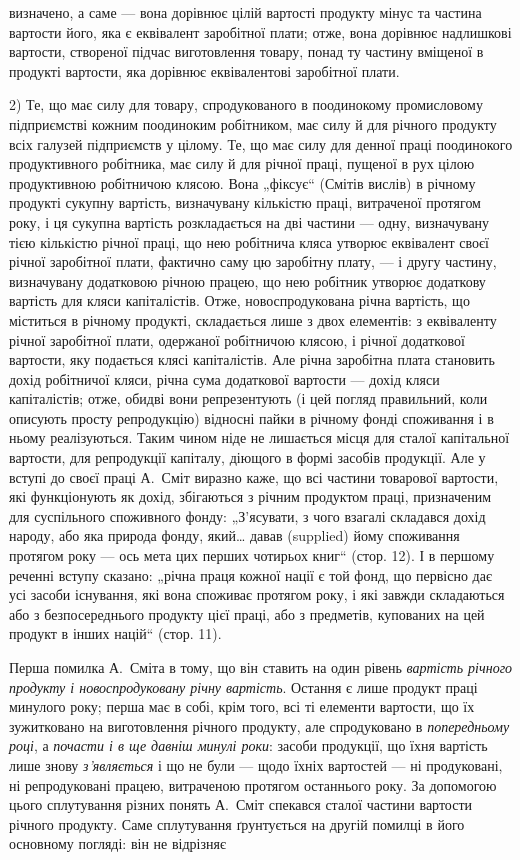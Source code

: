 \parcont{}  %
визначено, а саме — вона дорівнює цілій вартості продукту мінус та частина вартости його, яка є
еквівалент заробітної плати; отже, вона дорівнює надлишкові вартости, створеної підчас виготовлення
товару, понад ту частину вміщеної в продукті вартости, яка дорівнює еквівалентові заробітної плати.

2) Те, що має силу для товару, спродукованого в поодинокому промисловому підприємстві кожним
поодиноким робітником, має силу й для річного продукту всіх галузей підприємств у цілому. Те, що має
силу для денної праці поодинокого продуктивного робітника, має силу й для річної праці, пущеної в
рух цілою продуктивною робітничою клясою. Вона „фіксує“ (Смітів вислів) в річному продукті сукупну
вартість, визначувану кількістю праці, витраченої протягом року, і ця сукупна вартість розкладається
на дві частини — одну, визначувану тією кількістю річної праці, що нею робітнича кляса утворює
еквівалент своєї річної заробітної плати, фактично саму цю заробітну плату, — і другу частину,
визначувану додатковою річною працею, що нею робітник утворює додаткову вартість для кляси
капіталістів. Отже, новоспродукована річна вартість, що міститься в річному продукті, складається
лише з двох елементів: з еквіваленту річної заробітної плати, одержаної робітничою клясою, і
річної додаткової вартости, яку подається клясі капіталістів. Але річна заробітна плата становить
дохід робітничої кляси, річна сума додаткової вартости — дохід кляси капіталістів; отже, обидві вони
репрезентують (і цей погляд правильний, коли описують просту репродукцію) відносні пайки в річному
фонді споживання і в ньому реалізуються. Таким чином ніде не лишається місця для сталої капітальної
вартости, для репродукції капіталу, діющого в формі засобів продукції. Але у вступі до своєї праці
А.~Сміт виразно каже, що всі частини товарової вартости, які функціонують як дохід, збігаються з
річним продуктом праці, призначеним для суспільного споживного фонду: „З’ясувати, з чого взагалі
складався дохід народу, або яка природа фонду, який\dots{} давав (supplied) йому споживання протягом
року — ось мета цих перших чотирьох книг“ (стор. 12). І в першому реченні вступу сказано: „річна
праця кожної нації є той фонд, що первісно дає усі засоби існування, які вона споживає протягом
року, і які завжди складаються або з безпосереднього продукту цієї праці, або з предметів, купованих
на цей продукт в інших націй“ (стор. 11).

Перша помилка А.~Сміта в тому, що він ставить на один рівень \emph{вартість річного продукту і
новоспродуковану річну вартість}. Остання є лише продукт праці минулого року; перша має в собі, крім
того, всі ті елементи вартости, що їх зужитковано на виготовлення річного продукту, але спродуковано
в \emph{попередньому році}, а \emph{почасти і в ще давніш минулі роки}: засоби продукції, що їхня вартість лише
знову \emph{з’являється} і що не були — щодо їхніх вартостей — ні продуковані, ні репродуковані працею,
витраченою протягом останнього року. За допомогою цього сплутування різних понять А.~Сміт
спекався сталої частини вартости річного продукту. Саме сплутування ґрунтується на другій помилці в
його основному погляді: він не відрізняє
\parbreak{}  %
